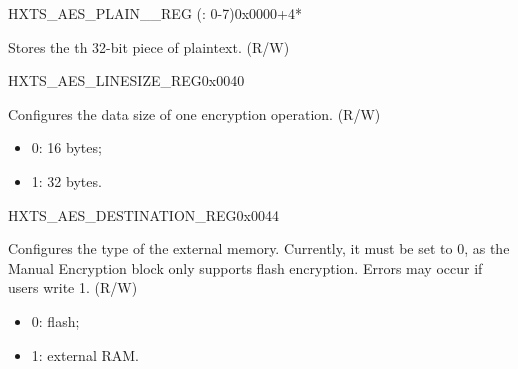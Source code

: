 

\begin{register}{H}{XTS\_AES\_PLAIN\_\_REG (: 0-7)}{0x0000+4*}\label{regdesc:XTSAESPLAINNREG}
%
\regnewline%
\begin{regdesc}\begin{reglist}
\label{fielddesc:XTSAESPLAINN}\item [XTS\_AES\_PLAIN\_\regindex{n}] Stores the th 32-bit piece of plaintext. (R/W)
\end{reglist}\end{regdesc}
\end{register}



\begin{register}{H}{XTS\_AES\_LINESIZE\_REG}{0x0040}\label{regdesc:XTSAESLINESIZEREG}
%
%
\regnewline%
\begin{regdesc}\begin{reglist}
\item [XTS\_AES\_LINESIZE] Configures the data size of one encryption operation. (R/W)
    \begin{itemize}
        \item 0: 16 bytes;
        \item 1: 32 bytes.
    \end{itemize}
\end{reglist}\end{regdesc}
\end{register}


\begin{register}{H}{XTS\_AES\_DESTINATION\_REG}{0x0044}\label{regdesc:XTSAESDESTINATIONREG}
%
%
\regnewline%
\begin{regdesc}\begin{reglist}
\item [XTS\_AES\_DESTINATION] Configures the type of the external memory. Currently, it must be set to 0,
as the Manual Encryption block only supports flash encryption. Errors may occur if users write 1. (R/W)
    \begin{itemize}
        \item 0: flash;
        \item 1: external RAM.
    \end{itemize}

\end{reglist}\end{regdesc}
\end{register}


